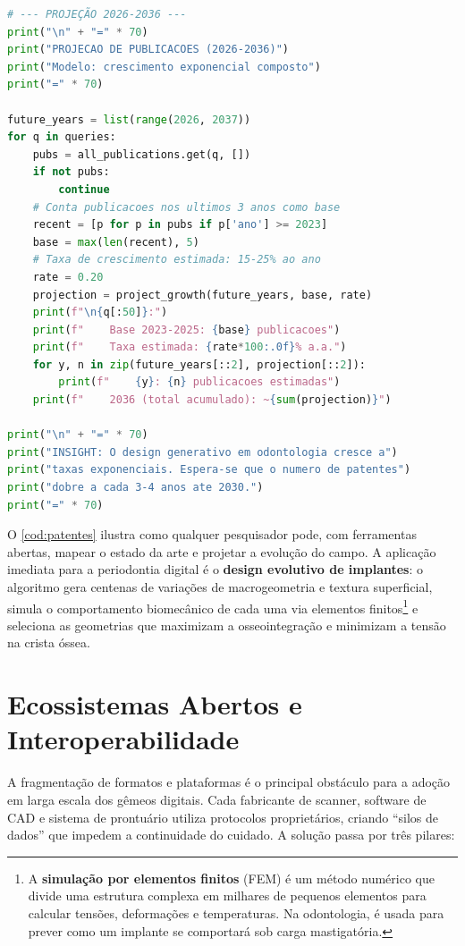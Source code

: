 \begin{lstlisting}[language=Python, caption={Busca automatizada de
patentes de design generativo em odontologia via OpenAlex API.},
label=cod:patentes]
# --- PROJEÇÃO 2026-2036 ---
print("\n" + "=" * 70)
print("PROJECAO DE PUBLICACOES (2026-2036)")
print("Modelo: crescimento exponencial composto")
print("=" * 70)

future_years = list(range(2026, 2037))
for q in queries:
    pubs = all_publications.get(q, [])
    if not pubs:
        continue
    # Conta publicacoes nos ultimos 3 anos como base
    recent = [p for p in pubs if p['ano'] >= 2023]
    base = max(len(recent), 5)
    # Taxa de crescimento estimada: 15-25% ao ano
    rate = 0.20
    projection = project_growth(future_years, base, rate)
    print(f"\n{q[:50]}:")
    print(f"    Base 2023-2025: {base} publicacoes")
    print(f"    Taxa estimada: {rate*100:.0f}% a.a.")
    for y, n in zip(future_years[::2], projection[::2]):
        print(f"    {y}: {n} publicacoes estimadas")
    print(f"    2036 (total acumulado): ~{sum(projection)}")

print("\n" + "=" * 70)
print("INSIGHT: O design generativo em odontologia cresce a")
print("taxas exponenciais. Espera-se que o numero de patentes")
print("dobre a cada 3-4 anos ate 2030.")
print("=" * 70)
\end{lstlisting}

O \autoref{cod:patentes} ilustra como qualquer pesquisador pode,
com ferramentas abertas, mapear o estado da arte e projetar a
evolução do campo. A aplicação imediata para a periodontia digital
é o \textbf{design evolutivo de implantes}: o algoritmo gera
centenas de variações de macrogeometria e textura superficial,
simula o comportamento biomecânico de cada uma via elementos
finitos\footnote{A \textbf{simulação por elementos finitos} (FEM)
é um método numérico que divide uma estrutura complexa em milhares
de pequenos elementos para calcular tensões, deformações e
temperaturas. Na odontologia, é usada para prever como um implante
se comportará sob carga mastigatória.} e seleciona as geometrias
que maximizam a osseointegração e minimizam a tensão na crista
óssea.


\section{Ecossistemas Abertos e Interoperabilidade}

A fragmentação de formatos e plataformas é o principal obstáculo
para a adoção em larga escala dos gêmeos digitais. Cada fabricante
de scanner, software de CAD e sistema de prontuário utiliza
protocolos proprietários, criando ``silos de dados'' que impedem a
continuidade do cuidado. A solução passa por três pilares:

